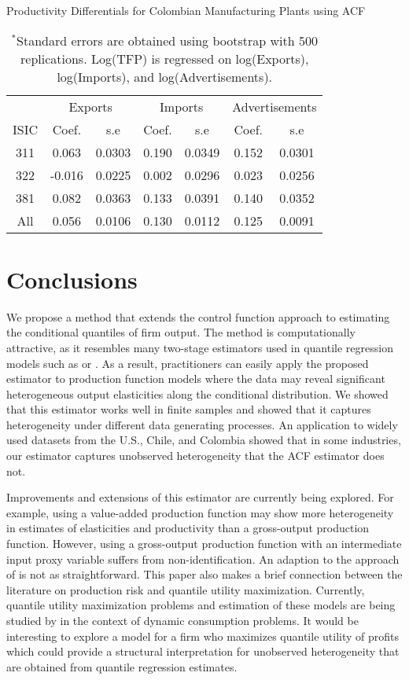 \documentclass[12pt]{article}
\begin{document}
\begin{table}[H]
\centering
\caption{Productivity Differentials for Colombian Manufacturing Plants using ACF}
\small
\begin{tabular}{ccccccc}
  \hline\hline & \multicolumn{2}{c}{Exports}  & \multicolumn{2}{c}{Imports} & \multicolumn{2}{c}{Advertisements} \\ \cmidrule(lr){2-3} \cmidrule(lr){4-5} \cmidrule(lr){6-7}ISIC & Coef. & s.e & Coef. & s.e & Coef. & s.e \\ 
  \hline
311 & 0.063 & 0.0303 & 0.190 & 0.0349 & 0.152 & 0.0301 \\ 
  322 & -0.016 & 0.0225 & 0.002 & 0.0296 & 0.023 & 0.0256 \\ 
  381 & 0.082 & 0.0363 & 0.133 & 0.0391 & 0.140 & 0.0352 \\ 
  All & 0.056 & 0.0106 & 0.130 & 0.0112 & 0.125 & 0.0091 \\ 
   \hline
\end{tabular}
\label{ACFCOLTFPP}
\caption*{\footnotesize $^{*}$Standard errors are obtained using bootstrap with 500 replications. Log(TFP) is regressed on log(Exports), log(Imports), and log(Advertisements).}
\end{table}

\section{Conclusions} \label{conclusion}

We propose a method that extends the control function approach to estimating the conditional quantiles of firm output. The method is computationally attractive, as it resembles many two-stage estimators used in quantile regression models such as \cite{Lee2007} or \cite{Chernozhukov2005}. As a result, practitioners can easily apply the proposed estimator to production function models where the data may reveal significant heterogeneous output elasticities along the conditional distribution. We showed that this estimator works well in finite samples and showed that it captures heterogeneity under different data generating processes. An application to widely used datasets from the U.S., Chile, and Colombia showed that in some industries, our estimator captures unobserved heterogeneity that the ACF estimator does not.

Improvements and extensions of this estimator are currently being explored. For example, using a value-added production function may show more heterogeneity in estimates of elasticities and productivity than a gross-output production function. However, using a gross-output production function with an intermediate input proxy variable suffers from non-identification. An adaption to the approach of \cite{Gandhi2020} is not as straightforward. This paper also makes a brief connection between the literature on production risk and quantile utility maximization. Currently, quantile utility maximization problems and estimation of these models are being studied by \cite{Castro2019} in the context of dynamic consumption problems. It would be interesting to explore a model for a firm who maximizes quantile utility of profits which could provide a structural interpretation for unobserved heterogeneity that are obtained from quantile regression estimates.
\end{document}
